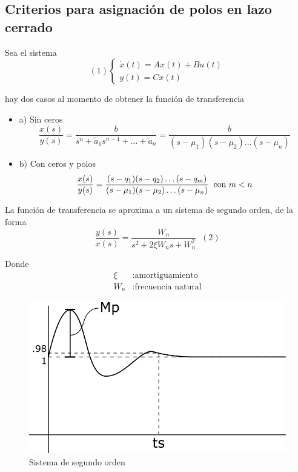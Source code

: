 \subsection{Criterios para asignación de polos en lazo cerrado}

Sea el sistema
\[(1)
    \left\{
        \begin{array}{lll}
            \dot{x}(t) = Ax(t) + Bu(t) \\
            y(t) = Cx(t)
        \end{array}
    \right.
\]

hay dos casos al momento de obtener la función de transferencia

\begin{itemize}
    \item a) Sin ceros
    \[
        \frac{x(s)}{y(s)} = \frac{b}{s^{n} + \tilde{a}_{1}s^{n-1} + \ldots + \tilde{a}_{n}} = \frac{b}{(s-\mu_{1})(s-\mu_{2})\ldots(s-\mu_{n})}
    \]
    \item b) Con ceros y polos
    \[
        \frac{x(s)}{y(s)} = \frac{(s-q_{1}) (s-q_{2}) \ldots (s-q_{m})}{(s-\mu_{1})(s-\mu_{2})\ldots(s-\mu_{n})} \;\; \text{con \( m < n \)}
    \]
    
\end{itemize}

La función de transferencia se aproxima a un sistema de segundo orden, de la forma
\[
    \frac{y(s)}{x(s)} = \frac{W_{n}}{s^{2} +2 \xi W_{n}s + W_{n}^{2} } \;\; (2)
\]

Donde 
\[
    \begin{split}
        \xi & : \text{amortiguamiento} \\
        W_{n} & : \text{frecuencia natural}
    \end{split}
\]

\begin{figure}[h!]
    \centering
        \includegraphics[scale=0.25]{Control de Sistemas Mecatronicos Figuras/18 Sistema de Segundo Orden.png}
        \caption{Sistema de segundo orden}
\end{figure}


